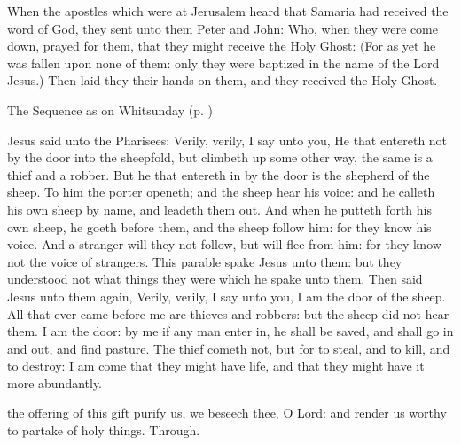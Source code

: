  When the apostles which were at Jerusalem heard that Samaria had received the word of God, they sent unto them Peter and John: Who, when they were come down, prayed for them, that they might receive the Holy Ghost: (For as yet he was fallen upon none of them: only they were baptized in the name of the Lord Jesus.) Then laid they their hands on them, and they received the Holy Ghost.
\begin{rubric}
{The Sequence as on Whitsunday (p. \pageref{WhitSeq})}
\end{rubric}

 Jesus said unto the Pharisees: Verily, verily, I say unto you, He that entereth not by the door into the sheepfold, but climbeth up some other way, the same is a thief and a robber. But he that entereth in by the door is the shepherd of the sheep. To him the porter openeth; and the sheep hear his voice: and he calleth his own sheep by name, and leadeth them out. And when he putteth forth his own sheep, he goeth before them, and the sheep follow him: for they know his voice. And a stranger will they not follow, but will flee from him: for they know not the voice of strangers. This parable spake Jesus unto them: but they understood not what things they were which he spake unto them. Then said Jesus unto them again, Verily, verily, I say unto you, I am the door of the sheep. All that ever came before me are thieves and robbers: but the sheep did not hear them. I am the door: by me if any man enter in, he shall be saved, and shall go in and out, and find pasture. The thief cometh not, but for to steal, and to kill, and to destroy: I am come that they might have life, and that they might have it more abundantly.


\vspace{-0.25\baselineskip}

\secret
{} the offering of this gift purify us, we beseech thee, O Lord: and render us worthy to partake of holy things. Through.

